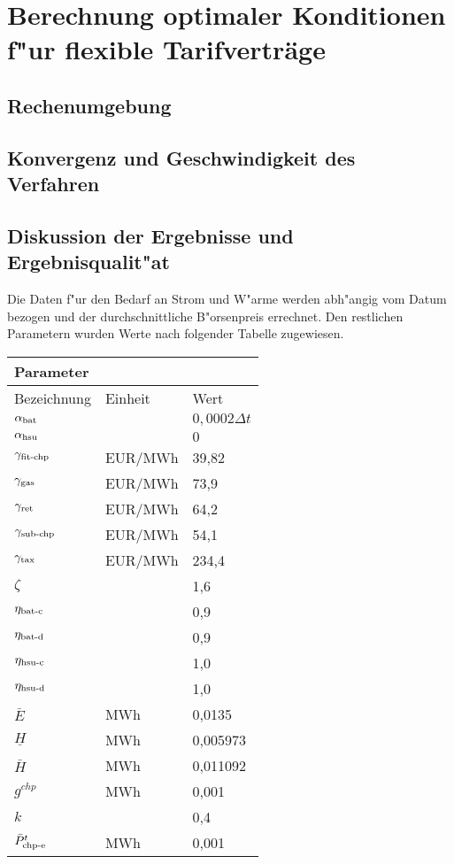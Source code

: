\section{Berechnung optimaler Konditionen f"ur flexible Tarifverträge}

\subsection{Rechenumgebung}

\subsection{Konvergenz und Geschwindigkeit des Verfahren}

\subsection{Diskussion der Ergebnisse und Ergebnisqualit"at} \label{results}

Die Daten f"ur den Bedarf an Strom und W"arme werden abh"angig vom Datum bezogen und der durchschnittliche B"orsenpreis errechnet. Den restlichen Parametern wurden Werte nach folgender Tabelle zugewiesen.

\begin{tabular}{l l l}
\multicolumn{3}{l}{Parameter}\\
\hline
Bezeichnung & Einheit & Wert \\
\hline
$\alpha_{\text{bat}}$ & & $0,0002 \Delta t$ \\
$\alpha_{\text{hsu}}$ & & $0$ \\
$\gamma_{\text{fit-chp}}$ & EUR/MWh & 39,82 \\
$\gamma_{\text{gas}}$ & EUR/MWh & 73,9 \\
$\gamma_{\text{ret}}$ & EUR/MWh & 64,2 \\
$\gamma_{\text{sub-chp}}$ & EUR/MWh & 54,1 \\
$\gamma_{\text{tax}}$ & EUR/MWh & 234,4 \\
$\zeta$ & & 1,6 \\
$\eta_{\text{bat-c}}$ & & 0,9 \\
$\eta_{\text{bat-d}}$ & & 0,9 \\
$\eta_{\text{hsu-c}}$ & & 1,0 \\
$\eta_{\text{hsu-d}}$ & & 1,0 \\
$\bar E$ & MWh & 0,0135 \\
$\underline{H}$ & MWh & 0,005973\\
$\bar H$ & MWh & 0,011092 \\
$g^{chp}$ & MWh & 0,001 \\
$k$ & & 0,4 \\
$\bar P^t_{\text{chp-e}}$ & MWh & 0,001 \\
\end{tabular}